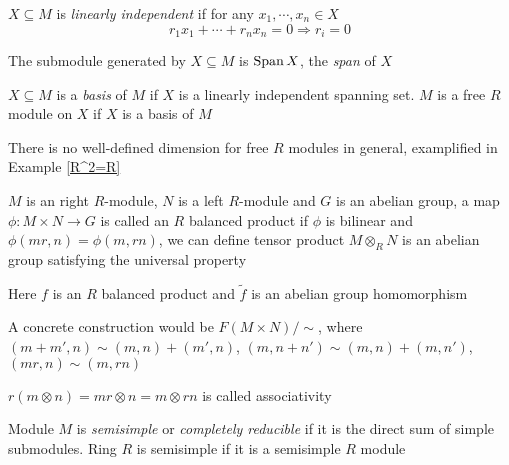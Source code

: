 \documentclass[main]{subfiles}
\begin{document}
\begin{definition}
$X\subseteq M$ is \textit{linearly independent} if for any $x_1,\cdots,x_n\in X$
\[r_1x_1+\cdots+r_nx_n=0\Rightarrow r_i=0\]
\end{definition}

\begin{definition}
The submodule generated by $X\subseteq M$ is $\operatorname{Span} X$, the \textit{span} of $X$
\end{definition}

\begin{definition}
$X\subseteq M$ is a \textit{basis} of $M$ if $X$ is a linearly independent spanning set. $M$ is a free $R$ module on $X$ if $X$ is a basis of $M$
\end{definition}

\begin{note}
There is no well-defined dimension for free $R$ modules in general, examplified in Example \ref{R^2=R}
\end{note}

\begin{definition}
$M$ is an right $R$-module, $N$ is a left $R$-module and $G$ is an abelian group, a map $\phi:M\times N\to G$ is called an $R$ balanced product if $\phi$ is bilinear and $\phi(mr,n)=\phi(m,rn)$, we can define tensor product $M\otimes_{R}N$ is an abelian group satisfying the universal property
\begin{center}
\end{center}
Here $f$ is an $R$ balanced product and $\tilde f$ is an abelian group homomorphism \par
A concrete construction would be $F(M\times N)/\sim$, where $(m+m',n)\sim(m,n)+(m',n)$, $(m,n+n')\sim(m,n)+(m,n')$, $(mr,n)\sim(m,rn)$
\end{definition}

\begin{remark}
$r(m\otimes n)=mr\otimes n=m\otimes rn$ is called associativity
\end{remark}

\begin{definition}
Module $M$ is \textit{semisimple} or \textit{completely reducible} if it is the direct sum of simple submodules. Ring $R$ is semisimple if it is a semisimple $R$ module
\end{definition}
\end{document}
